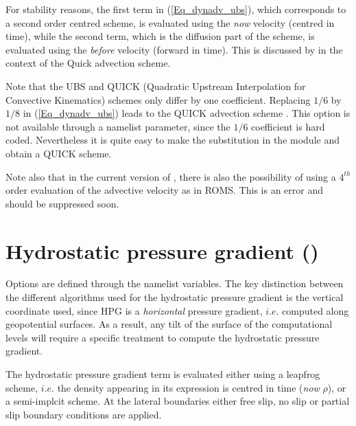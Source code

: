 \documentclass[NEMO_book]{subfiles}
\begin{document}
For stability reasons,  the first term in (\ref{Eq_dynadv_ubs}), which corresponds 
to a second order centred scheme, is evaluated using the \textit{now} velocity 
(centred in time), while the second term, which is the diffusion part of the scheme, 
is evaluated using the \textit{before} velocity (forward in time). This is discussed 
by \citet{Webb_al_JAOT98} in the context of the Quick advection scheme.

Note that the UBS and QUICK (Quadratic Upstream Interpolation for Convective Kinematics) 
schemes only differ by one coefficient. Replacing $1/6$ by $1/8$ in 
(\ref{Eq_dynadv_ubs}) leads to the QUICK advection scheme \citep{Webb_al_JAOT98}. 
This option is not available through a namelist parameter, since the $1/6$ coefficient 
is hard coded. Nevertheless it is quite easy to make the substitution in the
 module and obtain a QUICK scheme.

Note also that in the current version of , there is also the 
possibility of using a $4^{th}$ order evaluation of the advective velocity as in 
ROMS. This is an error and should be suppressed soon.

\section  [Hydrostatic pressure gradient (\textit{dynhpg})]
		{Hydrostatic pressure gradient ()}
\label{DYN_hpg}

Options are defined through the  namelist variables.
The key distinction between the different algorithms used for the hydrostatic 
pressure gradient is the vertical coordinate used, since HPG is a \emph{horizontal} 
pressure gradient, $i.e.$ computed along geopotential surfaces. As a result, any 
tilt of the surface of the computational levels will require a specific treatment to 
compute the hydrostatic pressure gradient.

The hydrostatic pressure gradient term is evaluated either using a leapfrog scheme, 
$i.e.$ the density appearing in its expression is centred in time (\emph{now} $\rho$), or 
a semi-implcit scheme. At the lateral boundaries either free slip, no slip or partial slip 
boundary conditions are applied.
\end{document}

